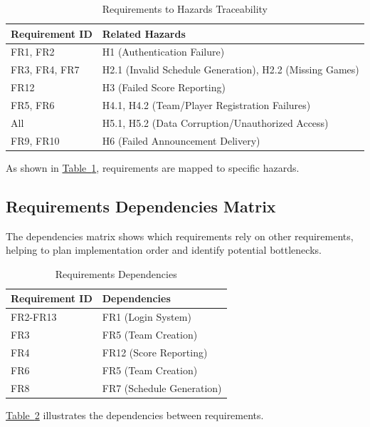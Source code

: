 \documentclass[12pt, titlepage]{article}
\begin{document}
\begin{table}[H]
\centering
\begin{tabular}{|p{}|p{}|}
\hline
\textbf{Requirement ID} & \textbf{Related Hazards} \\
\hline
FR1, FR2 & H1 (Authentication Failure) \\
\hline
FR3, FR4, FR7 & H2.1 (Invalid Schedule Generation), H2.2 (Missing Games) \\
\hline
FR12 & H3 (Failed Score Reporting) \\
\hline
FR5, FR6 & H4.1, H4.2 (Team/Player Registration Failures) \\
\hline
All & H5.1, H5.2 (Data Corruption/Unauthorized Access) \\
\hline
FR9, FR10 & H6 (Failed Announcement Delivery) \\
\hline
\end{tabular}
\caption{Requirements to Hazards Traceability}
\label{tab:req_hazard_matrix}
\end{table}

As shown in \hyperref[tab:req_hazard_matrix]{Table~\ref{tab:req_hazard_matrix}}, requirements are mapped to specific hazards.

\subsection{Requirements Dependencies Matrix}
The dependencies matrix shows which requirements rely on other requirements, helping to plan implementation order and identify potential bottlenecks.

\begin{table}[H]
\centering
\begin{tabular}{|p{}|p{}|}
\hline
\textbf{Requirement ID} & \textbf{Dependencies} \\
\hline
FR2-FR13 & FR1 (Login System) \\
\hline
FR3 & FR5 (Team Creation) \\
\hline
FR4 & FR12 (Score Reporting) \\
\hline
FR6 & FR5 (Team Creation) \\
\hline
FR8 & FR7 (Schedule Generation) \\
\hline
\end{tabular}
\caption{Requirements Dependencies}
\label{tab:req_dependencies}
\end{table}

\hyperref[tab:req_dependencies]{Table~\ref{tab:req_dependencies}} illustrates the dependencies between requirements.
\end{document}
